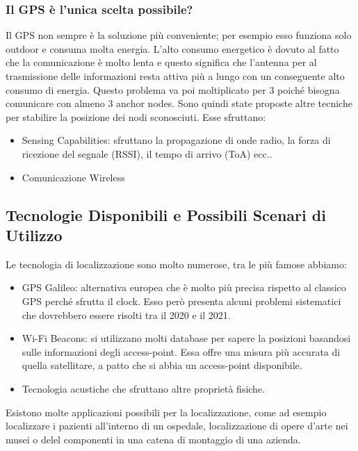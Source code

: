 \documentclass[12pt,a4paper]{article}
\begin{document}
		\subsubsection{Il GPS è l'unica scelta possibile?}\label{subsubsec3.1.1}
		Il GPS non sempre è la soluzione più conveniente; per esempio esso funziona solo outdoor e consuma molta energia. L'alto consumo energetico è dovuto al fatto che la comunicazione è molto lenta e questo significa che l'antenna per al trasmissione delle informazioni resta attiva più a lungo con un conseguente alto consumo di energia. Questo problema va poi moltiplicato per 3 poiché bisogna comunicare con almeno 3 anchor nodes.
		Sono quindi state proposte altre tecniche per stabilire la posizione dei nodi sconosciuti. Esse sfruttano:
		\begin{itemize}
			\item Sensing Capabilities: sfruttano la propagazione di onde radio, la forza di ricezione del segnale (RSSI), il tempo di arrivo (ToA) ecc..
			\item Comunicazione Wireless
		\end{itemize}
	
	\subsection{Tecnologie Disponibili e Possibili Scenari di Utilizzo}\label{subsec3.2}
	Le tecnologia di localizzazione sono molto numerose, tra le più famose abbiamo:
	\begin{itemize}
		\item GPS Galileo: alternativa europea che è molto più precisa rispetto al classico GPS perché sfrutta il clock. Esso però presenta alcuni problemi sistematici che dovrebbero essere risolti tra il 2020 e il 2021.
		\item Wi-Fi Beacons: si utilizzano molti database per sapere la posizioni basandosi sulle informazioni degli access-point. Essa offre una misura più accurata di quella satellitare, a patto che si abbia un access-point disponibile.
		\item Tecnologia acustiche che sfruttano altre proprietà fisiche.
	\end{itemize}	
	
	Esistono molte applicazioni possibili per la localizzazione, come ad esempio localizzare i pazienti all'interno di un ospedale, localizzazione di opere d'arte nei musei o delel componenti in una catena di montaggio di una azienda.
	
\end{document}
